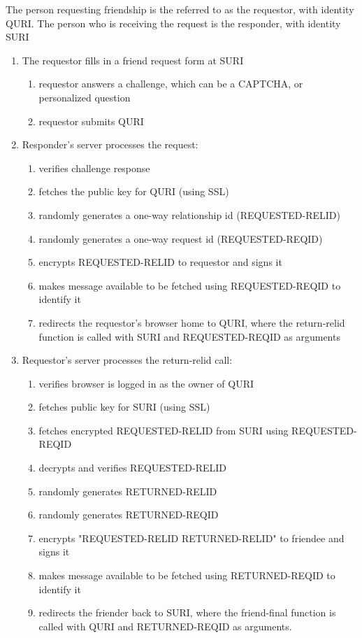 \documentclass[letterpaper,11pt,oneside]{article}
\begin{document}
The person requesting friendship is the referred to as the requestor, with
identity QURI. The person who is receiving the request is the responder, with
identity SURI

\begin{enumerate}
\item The requestor fills in a friend request form at SURI
    \begin{enumerate}
    \item requestor answers a challenge, which can be a CAPTCHA, or 
            personalized question
    \item requestor submits QURI
    \end{enumerate}

\item Responder's server processes the request:
    \begin{enumerate}
    \item verifies challenge response
    \item fetches the public key for QURI (using SSL)
    \item randomly generates a one-way relationship id (REQUESTED-RELID)
    \item randomly generates a one-way request id (REQUESTED-REQID)
    \item encrypts REQUESTED-RELID to requestor and signs it
    \item makes message available to be fetched using REQUESTED-REQID to identify it
    \item redirects the requestor's browser home to QURI, where the return-relid 
        function is called with SURI and REQUESTED-REQID as arguments
    \end{enumerate}

\item Requestor's server processes the return-relid call:
    \begin{enumerate}
    \item verifies browser is logged in as the owner of QURI
    \item fetches public key for SURI (using SSL)
    \item fetches encrypted REQUESTED-RELID from SURI using REQUESTED-REQID
    \item decrypts and verifies REQUESTED-RELID
    \item randomly generates RETURNED-RELID
    \item randomly generates RETURNED-REQID
    \item encrypts "REQUESTED-RELID RETURNED-RELID" to friendee and signs it
    \item makes message available to be fetched using RETURNED-REQID to identify it
    \item redirects the friender back to SURI, where the friend-final function is called
    with QURI and RETURNED-REQID as arguments.
    \end{enumerate}


\end{enumerate}
\end{document}

